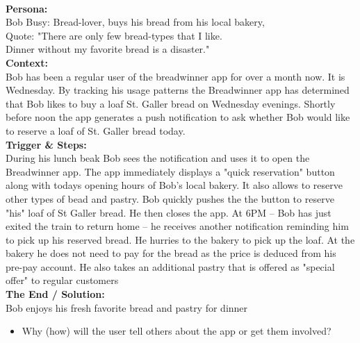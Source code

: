 \columnbreak
\begin{breakbox}
 \\

\textbf{Persona:} \\
Bob Busy: Bread-lover, buys his bread from his local bakery, \\
Quote: "There are only few bread-types that I like. \\
Dinner without my favorite bread is a disaster." \\
\textbf{Context:} \\
Bob has been a regular user of the breadwinner app for over a month now.
It is Wednesday.
By tracking his usage patterns the Breadwinner app has determined that Bob likes to buy a
loaf St. Galler bread on Wednesday evenings. Shortly before noon the app generates a push
notification to ask whether Bob would like to reserve a loaf of St. Galler bread today. \\
\textbf{Trigger \& Steps:} \\
During his lunch beak Bob sees the notification and uses it to open the Breadwinner app.
The app immediately displays a "quick reservation" button along with todays opening hours
of Bob's local bakery. It also allows to reserve other types of bead and pastry. Bob quickly
pushes the the button to reserve "his" loaf of St Galler bread. He then closes the app.
At 6PM – Bob has just exited the train to return home -- he receives another notification
reminding him to pick up his reserved bread. He hurries to the bakery to pick up the loaf. At
the bakery he does not need to pay for the bread as the price is deduced from his pre-pay
account. He also takes an additional pastry that is offered as "special offer" to regular
customers \\
\textbf{The End / Solution:} \\
Bob enjoys his fresh favorite bread and pastry for dinner

\end{breakbox}

\begin{breakbox}

\begin{itemize}
    \item Why (how) will the user tell others
about the app or get them involved?
\end{itemize}

\end{breakbox}

